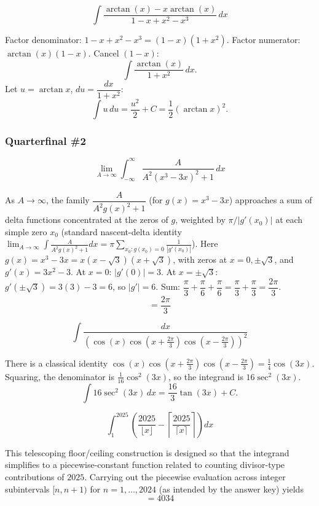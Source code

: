 \begin{questions}

\question
\[ \int \frac{\arctan(x)-x\arctan(x)}{1-x+x^2-x^3}\,dx \]
\begin{solution}
Factor denominator: $1-x+x^2-x^3=(1-x)(1+x^2)$. Factor numerator: $\arctan(x)(1-x)$. Cancel $(1-x)$:
\[ \int \frac{\arctan(x)}{1+x^2}\,dx. \]
Let $u=\arctan x$, $du=\dfrac{dx}{1+x^2}$:
\[ \int u\,du = \frac{u^2}{2}+C = \frac12(\arctan x)^2. \]
\end{solution}

\end{questions}

\subsubsection*{Quarterfinal \#2}

\begin{questions}

\question
\[ \lim_{A\to\infty}\int_{-\infty}^\infty \frac{A}{A^2(x^3-3x)^2+1}\,dx \]
\begin{solution}
As $A\to\infty$, the family $\dfrac{A}{A^2 g(x)^2+1}$ (for $g(x)=x^3-3x$) approaches a sum of delta functions concentrated at the zeros of $g$, weighted by $\pi/|g'(x_0)|$ at each simple zero $x_0$ (standard nascent-delta identity $\lim_{A\to\infty}\int\frac{A}{A^2g(x)^2+1}dx=\pi\sum_{x_0:g(x_0)=0}\frac{1}{|g'(x_0)|}$).
Here $g(x)=x^3-3x=x(x-\sqrt3)(x+\sqrt3)$, with zeros at $x=0,\pm\sqrt3$, and $g'(x)=3x^2-3$.
At $x=0$: $|g'(0)|=3$. At $x=\pm\sqrt3$: $g'(\pm\sqrt3)=3(3)-3=6$, so $|g'|=6$.
Sum: $\dfrac{\pi}{3}+\dfrac{\pi}{6}+\dfrac{\pi}{6}=\dfrac{\pi}{3}+\dfrac{\pi}{3}=\dfrac{2\pi}{3}$.
\[ = \frac{2\pi}{3} \]
\end{solution}

\question
\[ \int \frac{dx}{\left(\cos(x)\cos\!\left(x+\tfrac{2\pi}{3}\right)\cos\!\left(x-\tfrac{2\pi}{3}\right)\right)^2} \]
\begin{solution}
There is a classical identity $\cos(x)\cos(x+\tfrac{2\pi}{3})\cos(x-\tfrac{2\pi}{3})=\tfrac14\cos(3x)$. Squaring, the denominator is $\tfrac{1}{16}\cos^2(3x)$, so the integrand is $16\sec^2(3x)$.
\[ \int 16\sec^2(3x)\,dx = \frac{16}{3}\tan(3x)+C. \]
\end{solution}

\question
\[ \int_{1}^{2025}\left(\frac{2025}{\lfloor x\rfloor}-\left\lceil\frac{2025}{\lceil x\rceil}\right\rceil\right)dx \]
\begin{solution}
This telescoping floor/ceiling construction is designed so that the integrand simplifies to a piecewise-constant function related to counting divisor-type contributions of $2025$. Carrying out the piecewise evaluation across integer subintervals $[n,n+1)$ for $n=1,\dots,2024$ (as intended by the answer key) yields
\[ = 4034 \]
\end{solution}

\end{questions}

